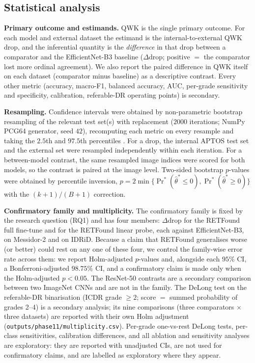 \documentclass[journal]{IEEEtran}
\renewcommand{\_}{\origunderscore\allowbreak}
\begin{document}
\subsection{Statistical analysis}
\label{sec:methods-stats}

\textbf{Primary outcome and estimands.} QWK is the single primary outcome. For
each model and external dataset the estimand is the internal-to-external QWK
drop, and the inferential quantity is the \emph{difference} in that drop between
a comparator and the EfficientNet-B3 baseline ($\Delta$drop; positive $=$ the
comparator lost more ordinal agreement). We also report the paired difference in
QWK itself on each dataset (comparator minus baseline) as a descriptive
contrast. Every other metric (accuracy, macro-F1, balanced accuracy, AUC,
per-grade sensitivity and specificity, calibration, referable-DR operating
points) is secondary.

\textbf{Resampling.} Confidence intervals were obtained by non-parametric
bootstrap resampling of the relevant test set(s) with replacement ($2000$
iterations; NumPy PCG64 generator, seed $42$), recomputing each metric on every
resample and taking the $2.5$th and $97.5$th percentiles
\cite{efron1994bootstrap}. For a drop, the internal APTOS test set and the
external set were resampled independently within each iteration. For a
between-model contrast, the same resampled image indices were scored for both
models, so the contrast is paired at the image level. Two-sided bootstrap
$p$-values were obtained by percentile inversion,
$p=2\min\{\Pr^*(\hat\theta^*\leq 0),\Pr^*(\hat\theta^*\geq 0)\}$ with the
$(k+1)/(B+1)$ correction.

\textbf{Confirmatory family and multiplicity.} The confirmatory family is fixed
by the research question (RQ1) and has four members: $\Delta$drop for the
RETFound full fine-tune and for the RETFound linear probe, each against
EfficientNet-B3, on Messidor-2 and on IDRiD. Because a claim that RETFound
generalises worse (or better) could rest on any one of these four, we control
the family-wise error rate across them: we report Holm-adjusted $p$-values and,
alongside each $95\%$ CI, a Bonferroni-adjusted $98.75\%$ CI, and a
confirmatory claim is made only when the Holm-adjusted $p<0.05$. The ResNet-50
contrasts are a secondary comparison between two ImageNet CNNs and are not in
the family. The DeLong test \cite{delong1988,sun2014fast} on the referable-DR
binarisation (ICDR grade $\geq 2$; score $=$ summed probability of grades
2--4) is a secondary analysis; its nine comparisons (three comparators $\times$
three datasets) are reported with their own Holm adjustment
(\texttt{outputs/\allowbreak{}phase11/\allowbreak{}multiplicity.csv}). Per-grade
one-vs-rest DeLong tests, per-class sensitivities, calibration differences, and
all ablation and sensitivity analyses are exploratory: they are reported with
unadjusted CIs, are not used for confirmatory claims, and are labelled as
exploratory where they appear.
\end{document}
